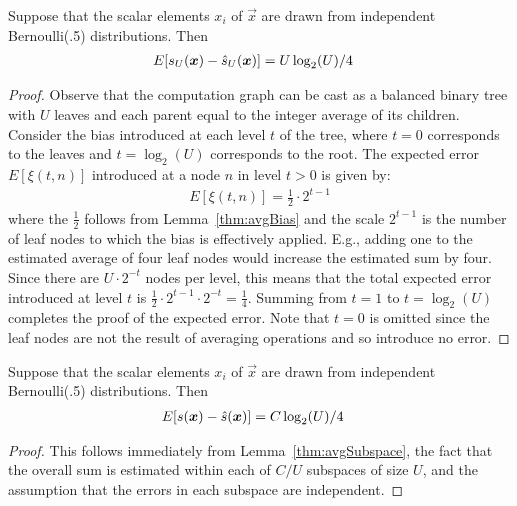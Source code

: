 \begin{lemma} \label{thm:avgSubspace}
Suppose that the scalar elements $x_i$ of $\vec{x}$ are drawn from independent Bernoulli(.5) distributions. Then
\begin{align}
    E[s_U(\bm{x}) - \hat{s}_U(\bm{x})] &= U \log_2(U) / 4
\end{align}
\end{lemma}
\begin{proof}
Observe that the computation graph can be cast as a balanced binary tree with $U$ leaves and each parent equal to the integer average of its children. Consider the bias introduced at each level $t$ of the tree, where $t=0$ corresponds to the leaves and $t = \log_2(U)$ corresponds to the root. The expected error $E[\xi(t, n)]$ introduced at a node $n$ in level $t > 0$ is given by:
\begin{align}
    E[\xi(t, n)] = \frac{1}{2} \cdot 2^{t - 1}
\end{align}
where the $\frac{1}{2}$ follows from Lemma~\ref{thm:avgBias} and the scale $2^{t - 1}$ is the number of leaf nodes to which the bias is effectively applied. E.g., adding one to the estimated average of four leaf nodes would increase the estimated sum by four. Since there are $U \cdot 2^{-t}$ nodes per level, this means that the total expected error introduced at level $t$ is $\frac{1}{2} \cdot 2^{t - 1} \cdot 2^{-t} = \frac{1}{4}$. Summing from $t = 1$ to $t = \log_2(U)$ completes the proof of the expected error. Note that $t=0$ is omitted since the leaf nodes are not the result of averaging operations and so introduce no error.

\end{proof}


\begin{theorem} \label{thm:overallBias}
Suppose that the scalar elements $x_i$ of $\vec{x}$ are drawn from independent Bernoulli(.5) distributions. Then
\begin{align}
    E[s(\bm{x}) - \hat{s}(\bm{x})] &= C \log_2(U) / 4
\end{align}
\end{theorem}
\begin{proof}
This follows immediately from Lemma~\ref{thm:avgSubspace}, the fact that the overall sum is estimated within each of $C / U$ subspaces of size $U$, and the assumption that the errors in each subspace are independent.
\end{proof}

